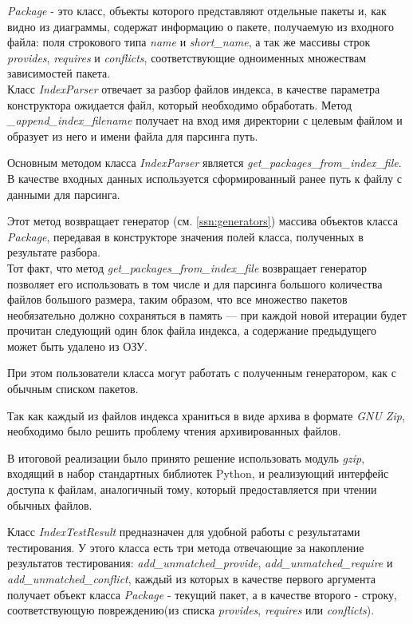 \textit{Package} - это класс, объекты которого представляют отдельные пакеты и, как видно из диаграммы,
содержат информацию о пакете, получаемую из входного файла: поля строкового типа \textit{name} и 
\textit{short\_name}, а так же массивы строк \textit{provides}, \textit{requires}
и \textit{conflicts}, соответствующие одноименных множествам зависимостей пакета.
\\

Класс \textit{IndexParser} отвечает за разбор файлов индекса, в качестве параметра конструктора
ожидается файл, который необходимо обработать. Метод \textit{\_append\_index\_filename} получает на вход
имя директории с целевым файлом и образует из него и имени файла для парсинга
путь.

Основным методом класса \textit{IndexParser} является \textit{get\_packages\_from\_index\_file}.
В качестве входных данных используется сформированный ранее путь к файлу с данными
для парсинга. 

Этот метод возвращает генератор (см. \ref{ssn:generators}) массива объектов класса \textit{Package},
передавая в конструкторе значения полей класса, полученных в результате разбора.\\

Тот факт, что метод \textit{get\_packages\_from\_index\_file} возвращает генератор позволяет
его использовать в том числе и для парсинга большого количества файлов большого размера, 
таким образом, что все множество пакетов необязательно должно сохраняться в память ---
при каждой новой итерации будет прочитан следующий один блок файла индекса, 
а содержание предыдущего может быть удалено из ОЗУ.

При этом пользователи класса могут работать с полученным генератором, как с обычным списком пакетов.

Так как каждый из файлов индекса храниться в виде архива в формате \textit{GNU Zip}, 
необходимо было решить проблему чтения архивированных файлов.

В итоговой реализации было принято решение использовать модуль \textit{gzip}, 
входящий в набор стандартных библиотек Python, и реализующий интерфейс доступа к файлам,
аналогичный тому, который предоставляется при чтении обычных файлов.

Класс \textit{IndexTestResult} предназначен для удобной работы с результатами тестирования. 
У этого класса есть три метода отвечающие за накопление результатов тестирования:
\textit{add\_unmatched\_provide}, \textit{add\_unmatched\_require} и \textit{add\_unmatched\_conflict}, каждый из которых
в качестве первого аргумента получает объект класса \textit{Package} - текущий пакет, а в качестве второго
- строку, соответствующую повреждению(из списка \textit{provides}, \textit{requires} или \textit{conflicts}).

